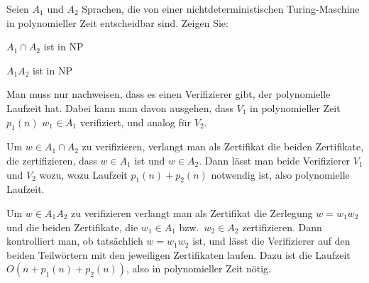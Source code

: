 Seien $A_1$ und $A_2$ Sprachen, die von einer nichtdeterministischen
Turing-Maschine in polynomieller Zeit entscheidbar sind. Zeigen Sie:
\begin{teilaufgaben}
\item $A_1\cap A_2$ ist in NP
\item $A_1A_2$ ist in NP
\end{teilaufgaben}


\begin{loesung}
Man muss nur nachweisen, dass es einen Verifizierer gibt, der polynomielle
Laufzeit hat. Dabei kann man davon ausgehen, dass $V_1$ in polynomieller
Zeit $p_1(n)$ $w_1\in A_1$ verifiziert, und analog für $V_2$.
\begin{teilaufgaben}
\item
Um $w\in A_1\cap A_2$ zu verifizieren, verlangt man als Zertifikat
die beiden Zertifikate, die zertifizieren, dass $w\in  A_1$
ist und $w\in A_2$. Dann lässt man beide Verifizierer
$V_1$ und $V_2$ wozu, wozu Laufzeit $p_1(n)+p_2(n)$ notwendig ist,
also polynomielle Laufzeit.
\item
Um $w\in A_1A_2$ zu verifizieren verlangt man als Zertifikat
die Zerlegung $w=w_1w_2$ und die beiden Zertifikate, die 
$w_1\in A_1$ bzw.~$w_2\in A_2$ zertifizieren. Dann kontrolliert
man, ob tatsächlich $w=w_1w_2$ ist, und  lässt
die Verifizierer auf den beiden Teilwörtern mit den
jeweiligen Zertifikaten laufen.
Dazu ist die Laufzeit
$O(n + p_1(n) + p_2(n))$, also in polynomieller Zeit nötig.
\qedhere
\end{teilaufgaben}
\end{loesung}
